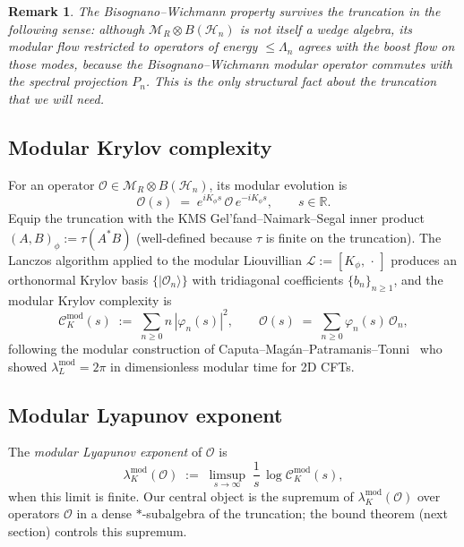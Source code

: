 \documentclass[12pt,a4paper]{article}
\newtheorem{remark}{Remark}
\begin{document}
\begin{remark}\label{rem:bw-truncation}
The Bisognano--Wichmann property survives the truncation in the
following sense: although $\mathcal{M}_R \otimes B(\mathcal{H}_n)$ is
not itself a wedge algebra, its modular flow restricted to operators
of energy $\le \Lambda_n$ agrees with the boost flow on those modes,
because the Bisognano--Wichmann modular operator commutes with the
spectral projection $P_n$.
This is the only structural fact about the truncation that we will
need.
\end{remark}

\subsection{Modular Krylov complexity}

For an operator $\mathcal{O} \in \mathcal{M}_R \otimes B(\mathcal{H}_n)$,
its modular evolution is
\begin{equation}
  \mathcal{O}(s) \;=\; e^{i K_\phi s}\,\mathcal{O}\,e^{-i K_\phi s},
  \qquad s \in \mathbb{R}.
  \label{eq:modular-flow}
\end{equation}
Equip the truncation with the KMS Gel'fand--Naimark--Segal inner product
$(A,B)_\phi := \tau(A^* B)$ (well-defined because $\tau$ is finite on
the truncation).
The Lanczos algorithm applied to the modular Liouvillian
$\mathcal{L} := [K_\phi,\,\cdot\,]$ produces an orthonormal Krylov
basis $\{|\mathcal{O}_n\rangle\}$ with tridiagonal coefficients
$\{b_n\}_{n\ge 1}$, and the modular Krylov complexity is
\begin{equation}
  \mathcal{C}_K^{\mathrm{mod}}(s)
  \;:=\;
  \sum_{n\ge 0} n\,|\varphi_n(s)|^2,
  \qquad
  \mathcal{O}(s) \;=\; \sum_{n\ge 0}\varphi_n(s)\,\mathcal{O}_n,
\end{equation}
following the modular construction of Caputa--Mag\'{a}n--Patramanis--Tonni~\cite{Caputa2024}
who showed $\lambda^{\mathrm{mod}}_L = 2\pi$ in dimensionless modular
time for 2D CFTs.

\subsection{Modular Lyapunov exponent}

The \emph{modular Lyapunov exponent} of $\mathcal{O}$ is
\begin{equation}
  \lambda_K^{\mathrm{mod}}(\mathcal{O})
  \;:=\;
  \limsup_{s\to\infty}\;\frac{1}{s}\,
  \log \mathcal{C}_K^{\mathrm{mod}}(s),
\end{equation}
when this limit is finite.
Our central object is the supremum of $\lambda_K^{\mathrm{mod}}(\mathcal{O})$
over operators $\mathcal{O}$ in a dense $\ast$-subalgebra of the
truncation; the bound theorem (next section) controls this supremum.
\end{document}
